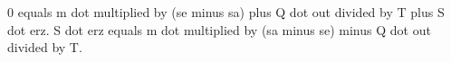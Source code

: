 0 equals m dot multiplied by (se minus sa) plus Q dot out divided by T plus S dot erz.  
S dot erz equals m dot multiplied by (sa minus se) minus Q dot out divided by T.